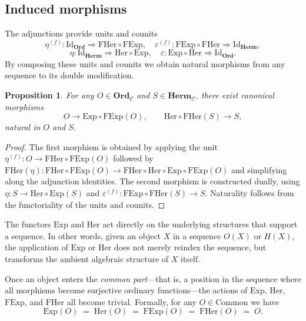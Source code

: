 \documentclass[11pt]{book}
\theoremstyle{definition}
\theoremstyle{plain}
\newtheorem{proposition}[theorem]{Proposition}
\theoremstyle{remark}
\begin{document}
\subsection{Induced morphisms}

The adjunctions provide units and counits
\[
\eta^{(f)}:\mathrm{Id}_{\mathbf{Ord}}\Rightarrow \mathrm{FHer}\circ\mathrm{FExp}, 
\quad \varepsilon^{(f)}:\mathrm{FExp}\circ\mathrm{FHer}\Rightarrow\mathrm{Id}_{\mathbf{Herm}},
\]
\[
\eta:\mathrm{Id}_{\mathbf{Herm}}\Rightarrow \mathrm{Her}\circ\mathrm{Exp}, 
\quad \varepsilon:\mathrm{Exp}\circ\mathrm{Her}\Rightarrow\mathrm{Id}_{\mathbf{Ord}}.
\]
By composing these units and counits we obtain natural morphisms 
from any sequence to its double modification.

\begin{proposition}
For any $O\in\mathbf{Ord}_{\mathcal C}$ and $S\in\mathbf{Herm}_{\mathcal C}$,
there exist canonical morphisms
\[
O \longrightarrow \mathrm{Exp}\circ\mathrm{FExp}(O),
\qquad
\mathrm{Her}\circ\mathrm{FHer}(S)\longrightarrow S,
\]
natural in $O$ and $S$.
\end{proposition}

\begin{proof}
The first morphism is obtained by applying the unit 
$\eta^{(f)}:O\to \mathrm{FHer}\circ\mathrm{FExp}(O)$
followed by $\mathrm{FHer}(\eta): \mathrm{FHer}\circ\mathrm{FExp}(O)\to
\mathrm{FHer}\circ\mathrm{Her}\circ\mathrm{Exp}\circ\mathrm{FExp}(O)$
and simplifying along the adjunction identities.
The second morphism is constructed dually, 
using $\eta:S\to\mathrm{Her}\circ\mathrm{Exp}(S)$
and $\varepsilon^{(f)}:\mathrm{FExp}\circ\mathrm{FHer}(S)\to S$.
Naturality follows from the functoriality of the units and counits.
\end{proof}

The functors $\mathrm{Exp}$ and $\mathrm{Her}$ act directly on the underlying 
structures that support a sequence. In other words, given an object $X$ in a 
sequence $O(X)$ or $H(X)$, the application of $\mathrm{Exp}$ or $\mathrm{Her}$ 
does not merely reindex the sequence, but transforms the ambient algebraic 
structure of $X$ itself. 

Once an object enters the \emph{common part}---that is, a position in the sequence 
where all morphisms become surjective ordinary functions---the actions of 
$\mathrm{Exp}$, $\mathrm{Her}$, $\mathrm{FExp}$, and $\mathrm{FHer}$ all become 
trivial. Formally, for any $O \in \text{Common}$ we have
\[
   \mathrm{Exp}(O) \;=\; \mathrm{Her}(O) \;=\; \mathrm{FExp}(O) \;=\; \mathrm{FHer}(O) \;=\; O.
\]
\end{document}
